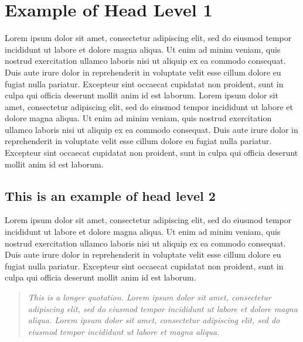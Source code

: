 \documentclass[english]{sbcreviews-2025}%
\begin{document}
\section{Example of Head Level 1}
Lorem ipsum dolor sit amet, consectetur adipiscing elit, sed do eiusmod tempor incididunt ut labore et dolore magna aliqua. Ut enim ad minim veniam, quis nostrud exercitation ullamco laboris nisi ut aliquip ex ea commodo consequat. Duis aute irure dolor in reprehenderit in voluptate velit esse cillum dolore eu fugiat nulla pariatur. Excepteur sint occaecat cupidatat non proident, sunt in culpa qui officia deserunt mollit anim id est laborum. Lorem ipsum dolor sit amet, consectetur adipiscing elit, sed do eiusmod tempor incididunt ut labore et dolore magna aliqua. Ut enim ad minim veniam, quis nostrud exercitation ullamco laboris nisi ut aliquip ex ea commodo consequat. Duis aute irure dolor in reprehenderit in voluptate velit esse cillum dolore eu fugiat nulla pariatur. Excepteur sint occaecat cupidatat non proident, sunt in culpa qui officia deserunt mollit anim id est laborum.

\subsection{This is an example of head level 2}

Lorem ipsum dolor sit amet, consectetur adipiscing elit, sed do eiusmod tempor incididunt ut labore et dolore magna aliqua. Ut enim ad minim veniam, quis nostrud exercitation ullamco laboris nisi ut aliquip ex ea commodo consequat. Duis aute irure dolor in reprehenderit in voluptate velit esse cillum dolore eu fugiat nulla pariatur. Excepteur sint occaecat cupidatat non proident, sunt in culpa qui officia deserunt mollit anim id est laborum.

\begin{quotation}
\textit{This is a longer quotation. Lorem ipsum dolor sit amet, consectetur adipiscing elit, sed do eiusmod tempor incididunt ut labore et dolore magna aliqua. Lorem ipsum dolor sit amet, consectetur adipiscing elit, sed do eiusmod tempor incididunt ut labore et magna aliqua.
}\end{quotation}
\end{document}
